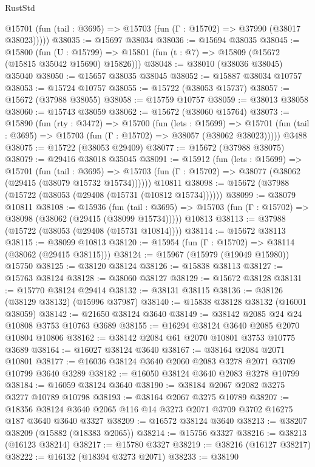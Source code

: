 \begin{lexlean}{RustStd}
\begin{coremodule}
      @15701 (fun (tail : @3695) => @15703 (fun (Γ : @15702) => @37990 (@38017 @38023)))))
@38035 := @15697 @38034
@38036 := @15694 @38035
@38045 := @15800
    (fun (U : @15799) => @15801 (fun (t : @7) => @15809 (@15672 (@15815 @35042 @15690) @15826)))
@38048 := @38010 (@38036 @38045) @35040
@38050 := @15657 @38035 @38045
@38052 := @15887 @38034 @10757
@38053 := @15724 @10757
@38055 := @15722 (@38053 @15737)
@38057 := @15672 (@37988 @38055)
@38058 := @15759 @10757
@38059 := @38013 @38058
@38060 := @15743 @38059
@38062 := @15672 (@38060 @15764)
@38073 := @15890
    (fun (rty : @3472) =>
    @15700
      (fun (lets : @15699) =>
      @15701 (fun (tail : @3695) => @15703 (fun (Γ : @15702) => @38057 (@38062 @38023)))))
    @3488
@38075 := @15722 (@38053 @29409)
@38077 := @15672 (@37988 @38075)
@38079 := @29416 @38018 @35045
@38091 := @15912
    (fun (lets : @15699) =>
    @15701
      (fun (tail : @3695) =>
      @15703 (fun (Γ : @15702) => @38077 (@38062 (@29415 (@38079 @15732 @15734))))))
    @10811
@38098 := @15672 (@37988 (@15722 (@38053 (@29408 (@15731 (@10812 @15734))))))
@38099 := @38079 @10811
@38108 := @15936
    (fun (tail : @3695) => @15703 (fun (Γ : @15702) => @38098 (@38062 (@29415 (@38099 @15734)))))
    @10813
@38113 := @37988 (@15722 (@38053 (@29408 (@15731 @10814))))
@38114 := @15672 @38113
@38115 := @38099 @10813
@38120 := @15954 (fun (Γ : @15702) => @38114 (@38062 (@29415 @38115)))
@38124 := @15967 (@15979 (@19049 @15980)) @15750
@38125 := @38120 @38124
@38126 := @15838 @38113
@38127 := @15763 @38124
@38128 := @38060 @38127
@38129 := @15672 @38128
@38131 := @15770 @38124 @29414
@38132 := @38131 @38115
@38136 := @38126 (@38129 @38132) (@15996 @37987)
@38140 := @15838 @38128 @38132 (@16001 @38059)
@38142 := @21650 @38124 @3640
@38149 := @38142 @2085 @24 @24 @10808 @3753 @10763 @3689
@38155 := @16294 @38124 @3640 @2085 @2070 @10804 @10806
@38162 := @38142 @2084 @61 @2070 @10801 @3753 @10775 @3689
@38164 := @16027 @38124 @3640
@38167 := @38164 @2084 @2071 @10801
@38177 := @16036 @38124 @3640 @2060 @2083 @3278 @2071 @3709 @10799 @3640 @3289
@38182 := @16050 @38124 @3640 @2083 @3278 @10799
@38184 := @16059 @38124 @3640
@38190 := @38184 @2067 @2082 @3275 @3277 @10789 @10798
@38193 := @38164 @2067 @3275 @10789
@38207 := @18356 @38124 @3640 @2065 @116 @14 @3273 @2071 @3709 @3702 @16275 @187 @3640 @3640 @3327
@38209 := @16572 @38124 @3640
@38213 := @38207 @38209 (@15882 (@18383 @2065))
@38214 := @15756 @3327
@38216 := @38213 (@16123 @38214)
@38217 := @15780 @3327
@38219 := @38216 (@16127 @38217)
@38222 := @16132 (@18394 @3273 @2071)
@38233 := @38190

\end{coremodule}
\end{lexlean}

